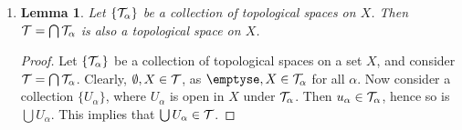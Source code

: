 \documentclass[12pt]{book}
\theoremstyle{plain}
\newtheorem{lemma}[theorem]{Lemma}
\newtheorem*{corollary}{Corollary}
\theoremstyle{plain} %
\theoremstyle{definition}
\theoremstyle{remark}
\begin{document}
\begin{enumerate}[label=(\arabic*)]
        \begin{corollary}
            $d'$ is a bounded metric.           		
        \end{corollary}
        \begin{proof}
            Consider the function $f:\R \rightarrow \R$ defined by  $f(x)=\frac{x}{1+x}$, which is
            continous on an interval $[a,b]$ and differentiable on $(a,b)$. Then by the mean value
            theorem, we have that there is a point $x \in (a,b)$for which
                \begin{equation*}
                    \frac{b}{1+b}-\frac{a}{1+a}=\frac{b-a}{x^2}
                \end{equation*}
            Then we have that
                \begin{equation*}
                    \frac{a+b}{1+a+b+ab}=\frac{b-a}{x^2} \leq \frac{a+b+2ab}{1+a+b+ab}
                \end{equation*}
                Hence we have that $f(a+b) \leq f(a)+f(b)$. Then composing $f$ with  $d$, we get
                $d'=f \circ d$, and so this shows that  $d'$ is a bounded metric.
        \end{proof}

        \begin{corollary}
            $d'$ induces the same topology as  $d$.		
        \end{corollary}
        \begin{proof}
            Consider the $\epsilon$-ball $B_d(x,\epsilon)$. By definition, we have that $d'(x,y)
            \leq d(x,y)$, Then $d'(x,y)=\frac{d(x,y)}{1+d(x,y)} \leq d(x,y)<\epsilon$, it follows
            that there is a $\delta$-ball  $B_{d'}(x,\delta) \subseteq B_d(x,\epsilon)$.

            On the other hand, we have $d'(x,y)+d(x,y)d'(x,y)=d(x,y)$, suppose then, that $y \in
            B_d(x,\epsilon)$, then $d'(x,y)+d(x,y)d'(x,y)<\epsilon$, then we also have that $d'(x,y)<\epsilon$; 
            that is to say $B_d(x,\epsilon) \subeteq B_{d'}(x,\epsilon)$.
        \end{proof}

    \item \begin{lemma}\label{0.0.2}
            Let $\{\mathcal{T}_\alpha\}$ be a collection of topological spaces on $X$. Then
            $\mathcal{T}=\bigcap{\mathcal{T}_\alpha}$ is also a topological space on $X$.
          \end{lemma}
        \begin{proof}
            Let $\{\mathcal{T}_\alpha\}$ be a collection of topological spaces on a set $X$, and consider
        $\mathcal{T}=\bigcap{\mathcal{T}_\alpha}$. Clearly, $\emptyset, X \in \mathcal{T}$, as $\emptyse, X \in \Tc_\alpha$
        for all $\alpha$. Now consider a collection $\{U_\alpha\}$, where $U_\alpha$ is open in  $X$
        under  $\mathcal{T}_\alpha$. Then  $u_\alpha \in \mathcal{T}_\alpha$, hence so is $\bigcup{U_\alpha}$. This
        implies that $\bigcup{U_\alpha} \in \mathcal{T}$.


\end{proof}
\end{enumerate}
\end{document}
